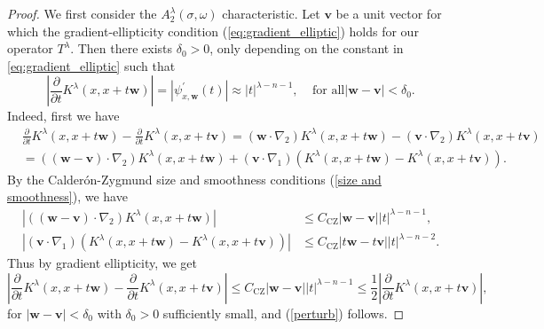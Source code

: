 \documentclass{amsart}%
\theoremstyle{plain}
\numberwithin{equation}{section}
\begin{document}
\begin{proof}
We first consider the $A_{2}^{\lambda}\left(  \sigma,\omega\right)  $
characteristic. Let $\mathbf{v}$ be a unit vector for which the
gradient-ellipticity condition (\ref{eq:gradient_elliptic}) holds for our
operator $T^{\lambda}$. Then there exists $\delta_{0}>0$, only depending on the constant in \eqref{eq:gradient_elliptic} such that
\begin{equation}
\left\vert \frac{\partial}{\partial t}K^{\lambda}\left(  x,x+t\mathbf{w}%
\right)  \right\vert =\left\vert \psi_{x,\mathbf{w}}^{\prime}\left(  t\right)
\right\vert \approx\left\vert t\right\vert ^{\lambda-n-1},\ \ \ \ \ \text{for
all}\left\vert \mathbf{w}-\mathbf{v}\right\vert <\delta_{0}.\label{perturb}%
\end{equation}
Indeed, first we have
\begin{align*}
&  \frac{\partial}{\partial t}K^{\lambda}\left(  x,x+t\mathbf{w}\right)
-\frac{\partial}{\partial t}K^{\lambda}\left(  x,x+t\mathbf{v}\right)
=\left(  \mathbf{w}\cdot\nabla_{2}\right)  K^{\lambda}\left(  x,x+t\mathbf{w}%
\right)  -\left(  \mathbf{v}\cdot\nabla_{2}\right)  K^{\lambda}\left(
x,x+t\mathbf{v}\right)  \\
&  =\left(  \left(  \mathbf{w}-\mathbf{v}\right)  \cdot\nabla_{2}\right)
K^{\lambda}\left(  x,x+t\mathbf{w}\right)  +\left(  \mathbf{v}\cdot\nabla
_{1}\right)  \left(  K^{\lambda}\left(  x,x+t\mathbf{w}\right)  -K^{\lambda
}\left(  x,x+t\mathbf{v}\right)  \right)  .
\end{align*}
By the Calder\'{o}n-Zygmund size and smoothness conditions 
(\ref{size and smoothness}), we have
\begin{align*}
\left\vert \left(  \left(  \mathbf{w}-\mathbf{v}\right)  \cdot\nabla
_{2}\right)  K^{\lambda}\left(  x,x+t\mathbf{w}\right)  \right\vert  &  \leq
C_{\operatorname*{CZ}}\left\vert \mathbf{w}-\mathbf{v}\right\vert \left\vert
t\right\vert ^{\lambda-n-1},\\
\left\vert \left(  \mathbf{v}\cdot\nabla_{1}\right)  \left(  K^{\lambda
}\left(  x,x+t\mathbf{w}\right)  -K^{\lambda}\left(  x,x+t\mathbf{v}\right)
\right)  \right\vert  &  \leq C_{\operatorname*{CZ}}\left\vert t\mathbf{w}%
-t\mathbf{v}\right\vert \left\vert t\right\vert ^{\lambda-n-2}.
\end{align*}
Thus by gradient ellipticity, we get
\[
\left\vert \frac{\partial}{\partial t}K^{\lambda}\left(  x,x+t\mathbf{w}%
\right)  -\frac{\partial}{\partial t}K^{\lambda}\left(  x,x+t\mathbf{v}%
\right)  \right\vert \leq C_{\operatorname*{CZ}}\left\vert \mathbf{w}%
-\mathbf{v}\right\vert \left\vert t\right\vert ^{\lambda-n-1}\leq\frac{1}%
{2}\left\vert \frac{\partial}{\partial t}K^{\lambda}\left(  x,x+t\mathbf{v}%
\right)  \right\vert ,
\]
for $\left\vert \mathbf{w}-\mathbf{v}\right\vert <\delta_{0}$ with $\delta
_{0}>0$ sufficiently small, and (\ref{perturb}) follows.


\end{proof}
\end{document}
